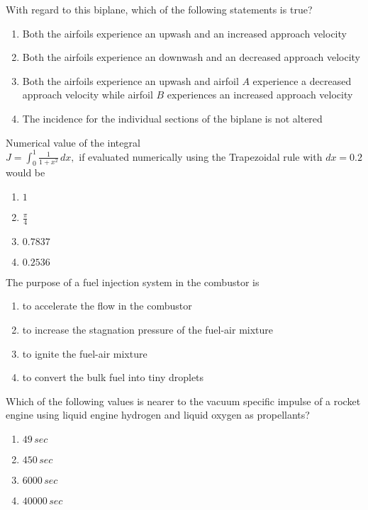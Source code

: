 With regard to this biplane, which of the following statements is true?
    \begin{enumerate}
        \item Both the airfoils experience an upwash and an increased approach velocity
        \item Both the airfoils experience an downwash and an decreased approach velocity
        \item Both the airfoils experience an upwash and airfoil $A$ experience a decreased approach velocity while airfoil $B$ experiences  an increased approach velocity
        \item The incidence for the individual sections of the biplane is not altered
    \end{enumerate}
    \item  Numerical value of the integral\\
    $J=\int_{0}^{1}\frac{1}{1+x^2}\, dx,$ if evaluated numerically using the Trapezoidal rule with $dx=0.2$ would be 
    \begin{enumerate}
        \item $1$
        \item $\frac{\pi}{4}$
        \item $0.7837$
        \item $0.2536$
    \end{enumerate}
    \item The purpose of  a fuel injection system in the combustor is
    \begin{enumerate}
        \item to accelerate the flow in the combustor
        \item to increase the stagnation pressure of the fuel-air mixture 
        \item to ignite the fuel-air mixture
        \item to convert the bulk fuel into tiny droplets
    \end{enumerate}
    \item Which of the following values is nearer to the vacuum specific impulse of a rocket engine using liquid engine hydrogen and liquid oxygen as propellants?
    \begin{enumerate}
        \item $49\,sec$
        \item $450\,sec$
        \item $6000\,sec$
        \item $40000\,sec$
    \end{enumerate}
